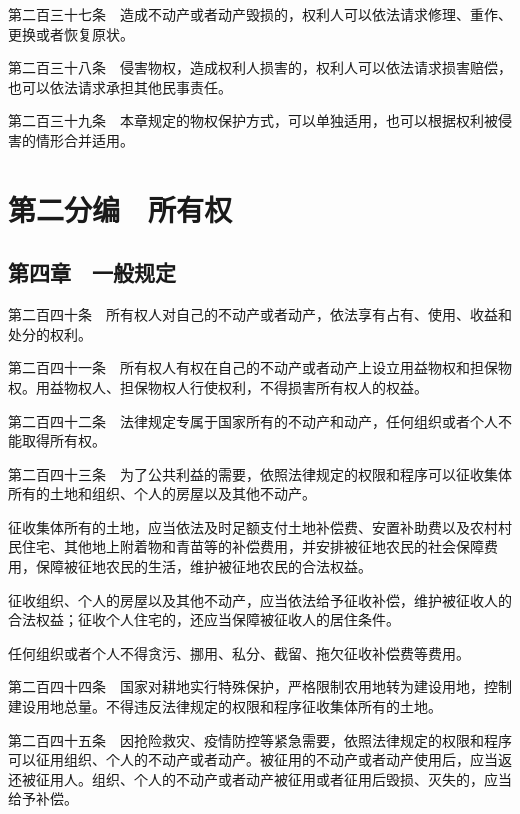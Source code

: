 \documentclass[UTF8,12pt,a4paper]{ctexbook}
\begin{document}
第二百三十七条　造成不动产或者动产毁损的，权利人可以依法请求修理、重作、更换或者恢复原状。

第二百三十八条　侵害物权，造成权利人损害的，权利人可以依法请求损害赔偿，也可以依法请求承担其他民事责任。

第二百三十九条　本章规定的物权保护方式，可以单独适用，也可以根据权利被侵害的情形合并适用。


\cleardoublepage
{}
\chapter*{第二分编　所有权}

\section*{第四章　一般规定}

第二百四十条　所有权人对自己的不动产或者动产，依法享有占有、使用、收益和处分的权利。

第二百四十一条　所有权人有权在自己的不动产或者动产上设立用益物权和担保物权。用益物权人、担保物权人行使权利，不得损害所有权人的权益。

第二百四十二条　法律规定专属于国家所有的不动产和动产，任何组织或者个人不能取得所有权。

第二百四十三条　为了公共利益的需要，依照法律规定的权限和程序可以征收集体所有的土地和组织、个人的房屋以及其他不动产。

征收集体所有的土地，应当依法及时足额支付土地补偿费、安置补助费以及农村村民住宅、其他地上附着物和青苗等的补偿费用，并安排被征地农民的社会保障费用，保障被征地农民的生活，维护被征地农民的合法权益。

征收组织、个人的房屋以及其他不动产，应当依法给予征收补偿，维护被征收人的合法权益；征收个人住宅的，还应当保障被征收人的居住条件。

任何组织或者个人不得贪污、挪用、私分、截留、拖欠征收补偿费等费用。

第二百四十四条　国家对耕地实行特殊保护，严格限制农用地转为建设用地，控制建设用地总量。不得违反法律规定的权限和程序征收集体所有的土地。

第二百四十五条　因抢险救灾、疫情防控等紧急需要，依照法律规定的权限和程序可以征用组织、个人的不动产或者动产。被征用的不动产或者动产使用后，应当返还被征用人。组织、个人的不动产或者动产被征用或者征用后毁损、灭失的，应当给予补偿。

\end{document}
